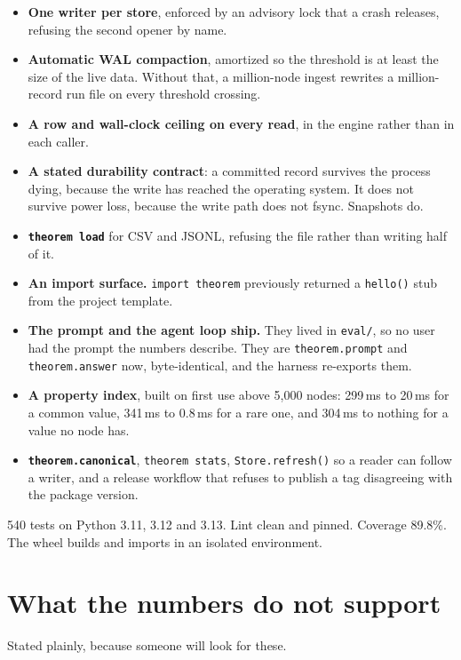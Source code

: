 \documentclass[11pt]{article}
\begin{document}
\begin{itemize}
  \item \textbf{One writer per store}, enforced by an advisory lock that a crash
    releases, refusing the second opener by name.
  \item \textbf{Automatic WAL compaction}, amortized so the threshold is at least
    the size of the live data. Without that, a million-node ingest rewrites a
    million-record run file on every threshold crossing.
  \item \textbf{A row and wall-clock ceiling on every read}, in the engine rather
    than in each caller.
  \item \textbf{A stated durability contract}: a committed record survives the
    process dying, because the write has reached the operating system. It does
    not survive power loss, because the write path does not fsync. Snapshots do.
  \item \textbf{\texttt{theorem load}} for CSV and JSONL, refusing the file rather
    than writing half of it.
  \item \textbf{An import surface.} \texttt{import theorem} previously returned a
    \texttt{hello()} stub from the project template.
  \item \textbf{The prompt and the agent loop ship.} They lived in \texttt{eval/},
    so no user had the prompt the numbers describe. They are
    \texttt{theorem.prompt} and \texttt{theorem.answer} now, byte-identical, and
    the harness re-exports them.
  \item \textbf{A property index}, built on first use above 5{,}000 nodes:
    299\,ms to 20\,ms for a common value, 341\,ms to 0.8\,ms for a rare one, and
    304\,ms to nothing for a value no node has.
  \item \textbf{\texttt{theorem.canonical}}, \texttt{theorem stats},
    \texttt{Store.refresh()} so a reader can follow a writer, and a release
    workflow that refuses to publish a tag disagreeing with the package version.
\end{itemize}

540 tests on Python 3.11, 3.12 and 3.13. Lint clean and pinned. Coverage 89.8\%.
The wheel builds and imports in an isolated environment.

\section{What the numbers do not support}

Stated plainly, because someone will look for these.
\end{document}
